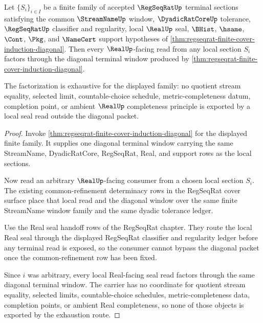 \begin{theorem}
\label{thm:regseqrat-finite-cover-diagonal-real-seal-exhaustion}
Let $\{S_i\}_{i \in I}$ be a finite family of accepted $\RegSeqRatUp$ terminal sections satisfying the common $\StreamNameUp$ window, $\DyadicRatCoreUp$ tolerance, $\RegSeqRatUp$ classifier and regularity, local $\RealUp$ seal, $\BHist$, $\hsame$, $\Cont$, $\Pkg$, and $\NameCert$ support hypotheses of \autoref{thm:regseqrat-finite-cover-induction-diagonal}. Then every $\RealUp$-facing read from any local section $S_i$ factors through the diagonal terminal window produced by \autoref{thm:regseqrat-finite-cover-induction-diagonal}.

The factorization is exhaustive for the displayed family: no quotient stream equality, selected limit, countable-choice schedule, metric-completeness datum, completion point, or ambient $\RealUp$ completeness principle is exported by a local seal read outside the diagonal packet.
\end{theorem}
\begin{proof}
Invoke \autoref{thm:regseqrat-finite-cover-induction-diagonal} for the displayed finite family. It supplies one diagonal terminal window carrying the same StreamName, DyadicRatCore, RegSeqRat, Real, and support rows as the local sections.

Now read an arbitrary $\RealUp$-facing consumer from a chosen local section $S_i$. The existing common-refinement determinacy rows in the RegSeqRat cover surface place that local read and the diagonal window over the same finite StreamName window family and the same dyadic tolerance ledger.

Use the Real seal handoff rows of the RegSeqRat chapter. They route the local Real seal through the displayed RegSeqRat classifier and regularity ledger before any terminal read is exposed, so the consumer cannot bypass the diagonal packet once the common-refinement row has been fixed.

Since $i$ was arbitrary, every local Real-facing seal read factors through the same diagonal terminal window. The carrier has no coordinate for quotient stream equality, selected limits, countable-choice schedules, metric-completeness data, completion points, or ambient Real completeness, so none of those objects is exported by the exhaustion route.
\end{proof}

